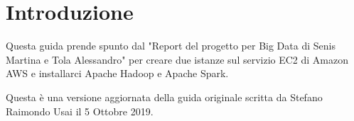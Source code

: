 \section{Introduzione}

Questa guida prende spunto dal "Report del progetto per Big Data di Senis Martina e Tola Alessandro" per creare due istanze sul servizio EC2 di Amazon AWS e installarci Apache Hadoop e Apache Spark.

Questa è una versione aggiornata della guida originale scritta da Stefano Raimondo Usai il 5 Ottobre 2019.
